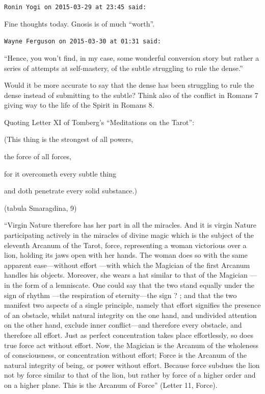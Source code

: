 \begin{footnotesize}
\begin{sffamily}
\texttt{Ronin Yogi on 2015-03-29 at 23:45 said:}

Fine thoughts today. Gnosis is of much ``worth''.

\hfill

\texttt{Wayne Ferguson on 2015-03-30 at 01:31 said:} 

``Hence, you won't find, in my case, some wonderful conversion story but rather a series of attempts at self-mastery, of the subtle struggling to rule the dense.''

Would it be more accurate to say that the dense has been struggling to rule the dense instead of submitting to the subtle? Think also of the conflict in Romans 7 giving way to the life of the Spirit in Romans 8.

Quoting Letter XI of Tomberg's ``Meditations on the Tarot'':

(This thing is the strongest of all powers,

the force of all forces,

for it overcometh every subtle thing

and doth penetrate every solid substance.)

(tabula Smaragdina, 9)

``Virgin Nature therefore has her part in all the miracles. And it is virgin Nature participating actively in the miracles of divine magic which is the subject of the eleventh Arcanum of the Tarot, force, representing a woman victorious over a lion, holding its jaws open with her hands. The woman does so with the same apparent ease---without effort ---with which the Magician of the first Arcanum handles his objects. Moreover, she wears a hat similar to that of the Magician ---in the form of a lemniscate. One could say that the two stand equally under the sign of rhythm ---the respiration of eternity---the sign ? ; and that the two manifest two aspects of a single principle, namely that effort signifies the presence of an obstacle, whilst natural integrity on the one hand, and undivided attention on the other hand, exclude inner conflict---and therefore every obstacle, and therefore all effort. Just as perfect concentration takes place effortlessly, so does true force act without effort. Now, the Magician is the Arcanum of the wholeness of consciousness, or concentration without effort; Force is the Arcanum of the natural integrity of being, or power without effort. Because force subdues the lion not by force similar to that of the lion, but rather by force of a higher order and on a higher plane. This is the Arcanum of Force'' (Letter 11, Force).


\end{sffamily}
\end{footnotesize}
